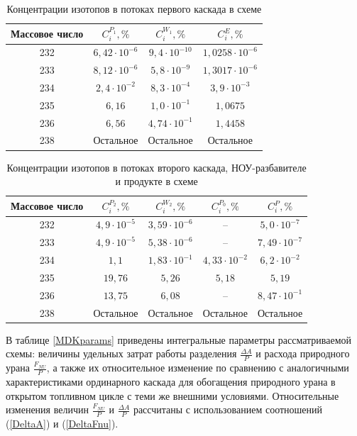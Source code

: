    \begin{table}[ht]
\begin{tabular}{|c|c|c|c|}
    \hline Массовое число & $C_{i}^{P_{1}}, \%$ & $C_{i}^{W_{1}}, \%$ & $C_{i}^{E}, \%$\\\hline 
    232 & $6,42\cdot10^{-6}$ & $9,4\cdot10^{-10}$ & $1,0258\cdot10^{-6}$\\
    233 & $8,12\cdot10^{-6}$ & $5,8\cdot10^{-9}$ & $1,3017\cdot10^{-6}$\\
    234 & $2,4\cdot10^{-2}$ & $8,3\cdot10^{-4}$ & $3,9\cdot10^{-3}$\\
    235 & $6,16$ & $1,0\cdot10^{-1}$ & $1,0675$\\
    236 & $6,56$ & $4,74\cdot10^{-1}$ & $1,4458$\\
    238 & Остальное & Остальное & Остальное\\
    \hline
\end{tabular}
\caption{Концентрации изотопов в потоках первого каскада в схеме}\label{MDKcas1params}
\end{table}

\begin{table}[ht]
    \begin{tabular}{|c|c|c|c|c|}
        \hline Массовое число & $C_{i}^{P_{2}}, \%$ & $C_{i}^{W_{2}}, \%$ & $C_{i}^{P_{0}}, \%$ & $C_{i}^{P}, \%$\\
        \hline 232 & $4,9\cdot10^{-5}$ & $3,59\cdot10^{-6}$ & -- & $5,0\cdot10^{-7}$\\
        233 & $4,9\cdot10^{-5}$ & $5,38\cdot10^{-6}$ & -- & $7,49\cdot10^{-7}$\\
        234 & $1,1$ & $1,83\cdot10^{-1}$ & $4,33\cdot10^{-2}$ & $6,2\cdot10^{-2}$\\
        235 & $19,76$ & $5,26$ & $5,18$  & $5,19$\\
        236 & $13,75$ & $6,08$ & --  & $8,47\cdot10^{-1}$\\
        238 & Остальное & Остальное & Остальное  & Остальное\\
        \hline
\end{tabular}
\caption{Концентрации изотопов в потоках второго каскада, НОУ-разбавителе и продукте в схеме}\label{MDKcas2params}
\end{table}

В таблице \ref{MDKparams} приведены интегральные параметры рассматриваемой схемы: величины удельных затрат работы разделения $\frac{\Delta A}{P}$ и расхода природного урана $\frac{F_{NU}}{P}$, а также их относительное изменение по сравнению с аналогичными характеристиками ординарного каскада для обогащения природного урана в открытом топливном цикле с теми же внешними условиями. Относительные изменения величин $\frac{F_{NU}}{P}$ и $\frac{\Delta A}{P}$ рассчитаны с использованием соотношений (\ref{DeltaA}) и (\ref{DeltaFnu}).

